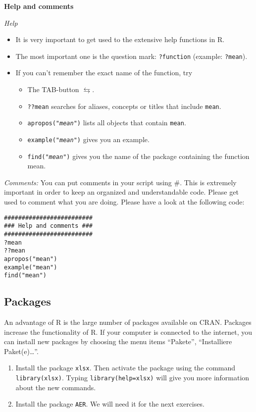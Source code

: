 \documentclass{article}
\begin{document}
\begin{solution}
\textbf{Help and comments}

\emph{Help}
\begin{itemize}
\item It is very important to get used to the extensive help functions in R.
\item The most important one is the question mark: \texttt{?function} (example: \texttt{?mean}).
\item If you can't remember the exact name of the function, try
   \begin{itemize}
     \item The TAB-button $\leftrightarrows$.
     \item \texttt{??mean} searches for aliases, concepts or titles that include \texttt{mean}.
     \item \texttt{apropos("\emph{mean}")} lists all objects that contain \texttt{mean}.
     \item \texttt{example("\emph{mean}")} gives you an example.
     \item \texttt{find("\emph{mean}")} gives you the name of the package containing the function mean.
   \end{itemize}
\end{itemize}

\emph{Comments:} You can put comments in your script using \#. This is extremely important in order to keep an organized and understandable code. Please get used to comment what you are doing. Please have a look at the following code:
\begin{verbatim}
#########################
### Help and comments ###
#########################
?mean
??mean
apropos("mean")
example("mean")
find("mean")
\end{verbatim}
\end{solution}

\subsection{Packages\label{packages}}

An advantage of R is the large number of packages available on CRAN. Packages increase the functionality of R. If your computer is connected to the internet, you can install new packages by choosing the menu items \textquotedblleft Pakete\textquotedblright , \textquotedblleft Installiere Paket(e)\ldots \textquotedblright .

\begin{enumerate}
\item Install the package \texttt{xlsx}. Then activate the package using the command \texttt{library(xlsx)}. Typing \texttt{library(help=xlsx)} will give you more information about the new commands.
\item Install the package \texttt{AER}. We will need it for the next exercises.
\end{enumerate}
\end{document}
